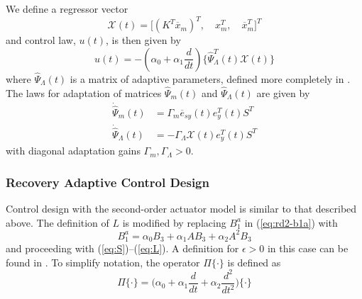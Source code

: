 \documentclass[english]{ifacconf}
\begin{document}
We define a regressor vector 
\begin{equation}
\mathcal{X}(t) = \big[ (K^T \overline{x}_m)^T,\quad x_m^T,\quad \overline{x}_m^T \big]^T
\end{equation}
and control law, $u(t)$, is then given by
\begin{equation}
u(t) = - (\alpha_0 + \alpha_1 \frac{d}{dt}) \big \{ \hat{\Psi}_{\Lambda}^T (t) \mathcal{X}(t) \big\}	
\end{equation}
where $\hat{\Psi}_{\Lambda}(t)$ is a matrix of adaptive parameters, defined more completely in \cite{qu2016adaptive}. The laws for adaptation of matrices $\hat{\Psi}_m(t)$ and $\hat{\Psi}_{\Lambda}(t)$ are given by
\begin{equation}
\begin{aligned}
	\dot{\hat{\Psi}}_m(t) &= \Gamma_{m} \overline{e}_{sy}(t) e_y^T(t) S^T \\
	\dot{\hat{\Psi}}_{\Lambda}(t) &= -\Gamma_{\Lambda} \mathcal{X}(t) e_y^T (t) S^T
\end{aligned} \label{eq:rd2-adaptation}
\end{equation}
with diagonal adaptation gains $\Gamma_{m}, \Gamma_{\Lambda} > 0$.

\subsubsection{Recovery Adaptive Control Design}
Control design with the second-order actuator model is similar to that described above. The definition of $L$ is modified by replacing $B_1^a$ in (\ref{eq:rd2-b1a}) with
\begin{equation}
B_1^a = \alpha_0 B_3 + \alpha_1 A B_3 + \alpha_2 A^2 B_3 \label{eq:rd3-b1a}
\end{equation}
and proceeding with (\ref{eq:S})--(\ref{eq:L}). A definition for $\epsilon>0$ in this case can be found in \cite{qu2016phd}. To simplify notation, the operator $\Pi \{\cdot \}$ is defined as
\begin{equation}
\Pi \{ \cdot \} = \big( \alpha_0 + \alpha_1 \frac{d}{dt} + \alpha_2 \frac{d^2}{dt^2} \big) \{ \cdot \}
\end{equation}
\end{document}

